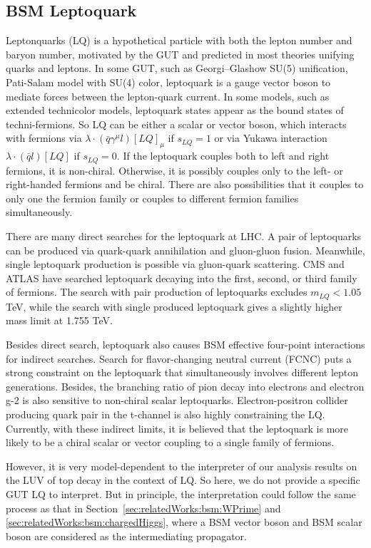 \FloatBarrier

\subsection{BSM Leptoquark}
\label{sec:relatedWorks:bsm:leptoquark}


Leptonquarks (LQ) is a hypothetical particle with both the lepton number and baryon number, motivated by the GUT and predicted in most theories unifying quarks and leptons. In some GUT, such as Georgi–Glashow SU(5) unification, Pati-Salam model with SU(4) color, leptoquark is a gauge vector boson to mediate forces between the lepton-quark current. In some models, such as extended technicolor models, leptoquark states appear as the bound states of techni-fermions. So LQ can be either a scalar or vector boson, which interacts with fermions via $\lambda \cdot (\bar{q} \gamma^\mu l) [LQ]_\mu$ if $s_{LQ}=1$ or via Yukawa interaction $\lambda \cdot (\bar{q}l) [LQ] $ if $s_{LQ}=0$. If the leptoquark couples both to left and right fermions, it is non-chiral. Otherwise, it is possibly couples only to the left- or right-handed fermions and be chiral. There are also possibilities that it couples to only one the fermion family or couples to different fermion families simultaneously. 

There are many direct searches for the leptoquark at LHC. A pair of leptoquarks can be produced via quark-quark annihilation and gluon-gluon fusion. Meanwhile, single leptoquark production is possible via gluon-quark scattering. CMS and ATLAS have searched leptoquark decaying into the first, second, or third family of fermions. The search with pair production of leptoquarks excludes $m_{LQ}<1.05$ TeV, while the search with single produced leptoquark gives a slightly higher mass limit at 1.755 TeV. 

Besides direct search, leptoquark also causes BSM effective four-point interactions for indirect searches. Search for flavor-changing neutral current (FCNC) puts a strong constraint on the leptoquark that simultaneously involves different lepton generations. Besides, the branching ratio of pion decay into electrons and electron g-2 is also sensitive to non-chiral scalar leptoquarks. Electron-positron collider producing quark pair in the t-channel is also highly constraining the LQ.  Currently, with these indirect limits, it is believed that the leptoquark is more likely to be a chiral scalar or vector coupling to a single family of fermions.

However, it is very model-dependent to the interpreter of our analysis results on the LUV of top decay in the context of LQ. So here, we do not provide a specific GUT LQ to interpret. But in principle, the interpretation could follow the same process as that in Section~\ref{sec:relatedWorks:bsm:WPrime} and \ref{sec:relatedWorks:bsm:chargedHiggs}, where a BSM vector boson and BSM scalar boson are considered as the intermediating propagator.



